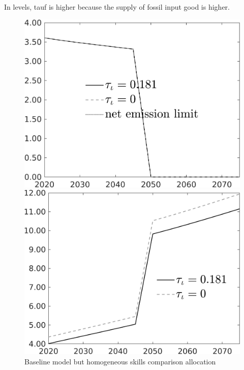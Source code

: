 \documentclass[12pt]{article}
\begin{document}
In levels, tauf is higher because the supply of fossil input good is higher. 
\begin{figure}[h!!]
	\centering
	\caption{Baseline model but homogeneous skills comparison allocation}\label{fig:Leveltauf_nsk1_xgr0_notaul}
	\begin{minipage}[]{0.32\textwidth}
		\includegraphics[width=1\textwidth]{../../codding_model/own_basedOnFried/optimalPol_010922_revision/figures/all_13Sept22/CompTauf_bytaul_Reg0_Emnet_spillover0_nsk1_xgr0_knspil0_sep0_LFlimit1_emsbase0_countec0_GovRev0_etaa0.79_lgd1.png}
	\end{minipage}		
	\begin{minipage}[]{0.32\textwidth}
		\includegraphics[width=1\textwidth]{../../codding_model/own_basedOnFried/optimalPol_010922_revision/figures/all_13Sept22/CompTauf_bytaul_Reg0_tauf_spillover0_nsk1_xgr0_knspil0_sep0_LFlimit1_emsbase0_countec0_GovRev0_etaa0.79_lgd1.png}

\end{minipage}
\end{figure}
\end{document}

